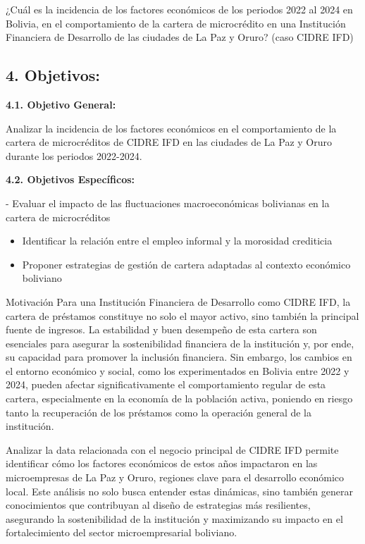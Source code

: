 \documentclass[Royal,times,sageh]{sagej}
\begin{document}
¿Cuál es la incidencia de los factores económicos de los periodos 2022
al 2024 en Bolivia, en el comportamiento de la cartera de microcrédito
en una Institución Financiera de Desarrollo de las ciudades de La Paz y
Oruro? (caso CIDRE IFD)

\subsection{\texorpdfstring{4.
\textbf{Objetivos:}}{4. Objetivos:}}\label{objetivos}

\textbf{4.1. Objetivo General:}

Analizar la incidencia de los factores económicos en el comportamiento
de la cartera de microcréditos de CIDRE IFD en las ciudades de La Paz y
Oruro durante los periodos 2022-2024.

\textbf{4.2. Objetivos Específicos:}

- Evaluar el impacto de las fluctuaciones macroeconómicas bolivianas en
la cartera de microcréditos

\begin{itemize}
\item
  Identificar la relación entre el empleo informal y la morosidad
  crediticia
\item
  Proponer estrategias de gestión de cartera adaptadas al contexto
  económico boliviano
\end{itemize}

Motivación Para una Institución Financiera de Desarrollo como CIDRE IFD,
la cartera de préstamos constituye no solo el mayor activo, sino también
la principal fuente de ingresos. La estabilidad y buen desempeño de esta
cartera son esenciales para asegurar la sostenibilidad financiera de la
institución y, por ende, su capacidad para promover la inclusión
financiera. Sin embargo, los cambios en el entorno económico y social,
como los experimentados en Bolivia entre 2022 y 2024, pueden afectar
significativamente el comportamiento regular de esta cartera,
especialmente en la economía de la población activa, poniendo en riesgo
tanto la recuperación de los préstamos como la operación general de la
institución.

Analizar la data relacionada con el negocio principal de CIDRE IFD
permite identificar cómo los factores económicos de estos años
impactaron en las microempresas de La Paz y Oruro, regiones clave para
el desarrollo económico local. Este análisis no solo busca entender
estas dinámicas, sino también generar conocimientos que contribuyan al
diseño de estrategias más resilientes, asegurando la sostenibilidad de
la institución y maximizando su impacto en el fortalecimiento del sector
microempresarial boliviano.
\end{document}
